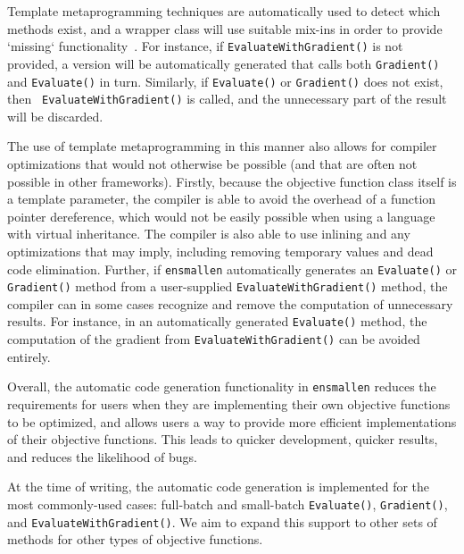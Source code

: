 \documentclass{article}
\begin{document}
Template metaprogramming techniques are automatically used to
detect which methods exist, and a wrapper class will use suitable mix-ins in
order to provide `missing` functionality~\cite{smaragdakis2000mixin}.  For
instance, if \texttt{\small EvaluateWithGradient()} is not provided, a version will be
automatically generated that calls both \texttt{\small Gradient()} and \texttt{\small Evaluate()} in turn.
Similarly, if \texttt{\small Evaluate()} or \texttt{\small Gradient()} does not exist, then {\tt
EvaluateWithGradient()} is called, and the unnecessary part of the result will
be discarded.

The use of template metaprogramming in this manner also allows for compiler optimizations that
would not otherwise be possible (and that are often not possible in other
frameworks).  Firstly, because the objective function class itself is a template
parameter, the compiler is able to avoid the overhead of a function pointer
dereference, which would not be easily possible when using a language with
virtual inheritance.  The compiler is also able to use inlining and any
optimizations that may imply, including removing temporary values and dead code
elimination.  Further, if {\tt ensmallen} automatically generates an
\texttt{\small Evaluate()} or \texttt{\small Gradient()} method from a user-supplied
\texttt{\small EvaluateWithGradient()} method, the compiler can in some cases recognize and
remove the computation of unnecessary results.  For instance, in an
automatically generated \texttt{\small Evaluate()} method, the computation of the gradient
from \texttt{\small EvaluateWithGradient()} can be avoided entirely.

Overall, the automatic code generation functionality in {\tt ensmallen}
reduces the requirements for users
when they are implementing their own objective functions to be optimized,
and allows users a way to provide more efficient implementations of their
objective functions.
This leads to quicker development, quicker results, and reduces the likelihood of bugs.

At the time of writing, the automatic code generation
is implemented for the most commonly-used cases:
full-batch and small-batch \texttt{\small Evaluate()}, \texttt{\small Gradient()},
and \texttt{\small EvaluateWithGradient()}.  We aim to expand this support to other
sets of methods for other types of objective functions.


\vspace*{-0.3em}
\end{document}
